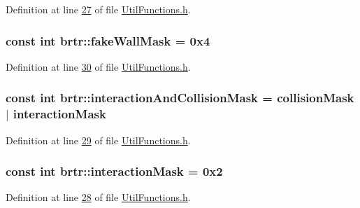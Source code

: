 Definition at line \hyperlink{_util_functions_8h_source_l00027}{27} of file \hyperlink{_util_functions_8h_source}{Util\+Functions.\+h}.

\hypertarget{namespacebrtr_a5a7668dd62a6cbf00234c926a109fbef}{
\subsubsection[{fake\+Wall\+Mask}]{\setlength{\rightskip}{0pt plus 5cm}const int brtr\+::fake\+Wall\+Mask = 0x4}}\label{namespacebrtr_a5a7668dd62a6cbf00234c926a109fbef}


Definition at line \hyperlink{_util_functions_8h_source_l00030}{30} of file \hyperlink{_util_functions_8h_source}{Util\+Functions.\+h}.

\hypertarget{namespacebrtr_a21ab851f18c0c85fa006766034833a4f}{
\subsubsection[{interaction\+And\+Collision\+Mask}]{\setlength{\rightskip}{0pt plus 5cm}const int brtr\+::interaction\+And\+Collision\+Mask = {\bf collision\+Mask} $\vert$ {\bf interaction\+Mask}}}\label{namespacebrtr_a21ab851f18c0c85fa006766034833a4f}


Definition at line \hyperlink{_util_functions_8h_source_l00029}{29} of file \hyperlink{_util_functions_8h_source}{Util\+Functions.\+h}.

\hypertarget{namespacebrtr_a2060f4d70c0e3bc7e2e35f82e279a40d}{
\subsubsection[{interaction\+Mask}]{\setlength{\rightskip}{0pt plus 5cm}const int brtr\+::interaction\+Mask = 0x2}}\label{namespacebrtr_a2060f4d70c0e3bc7e2e35f82e279a40d}


Definition at line \hyperlink{_util_functions_8h_source_l00028}{28} of file \hyperlink{_util_functions_8h_source}{Util\+Functions.\+h}.

